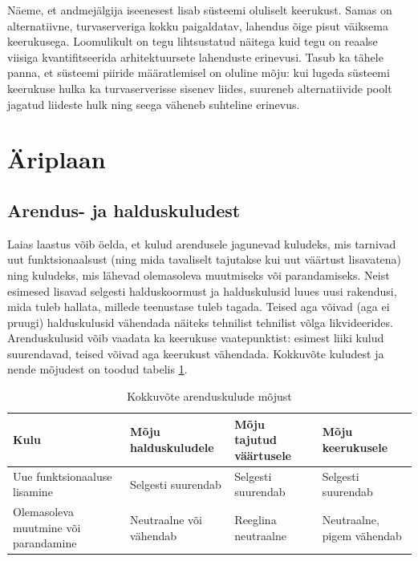 \documentclass{article}
\begin{document}
Näeme, et andmejälgija iseenesest lisab süsteemi oluliselt keerukust. Samas on alternatiivne, turvaserveriga kokku paigaldatav, lahendus õige pisut väiksema keerukusega. Loomulikult on tegu lihtsustatud näitega kuid tegu on reaalse viisiga kvantifitseerida arhitektuursete lahenduste erinevusi. Tasub ka tähele panna, et süsteemi piiride määratlemisel on oluline mõju: kui lugeda süsteemi keerukuse hulka ka turvaserverisse sisenev liides, suureneb alternatiivide poolt jagatud liideste hulk ning seega väheneb suhteline erinevus. 
	
\section{Äriplaan}
\subsection{Arendus- ja halduskuludest}
\label{sec:kulud}
Laias laastus võib öelda, et kulud arendusele jagunevad kuludeks, mis tarnivad uut funktsionaalsust (ning mida tavaliselt tajutakse kui uut väärtust lisavatena) ning kuludeks, mis lähevad olemasoleva muutmiseks või parandamiseks. Neist esimesed lisavad selgesti halduskoormust ja halduskulusid luues uusi rakendusi, mida tuleb hallata, millede teenustase tuleb tagada. Teised aga võivad (aga ei pruugi) halduskulusid vähendada näiteks tehnilist tehnilist võlga likvideerides. Arenduskulusid võib vaadata ka keerukuse vaatepunktist: esimest liiki kulud suurendavad, teised võivad aga keerukust vähendada. Kokkuvõte kuludest ja nende mõjudest on toodud tabelis \ref{tab:arendus}.

\begin{table}
	\begin{center}
		\begin{tabular}{p{3.8cm}p{2.4cm}p{2.1cm}p{2.7cm}}
		\toprule
Kulu & Mõju \mbox{halduskuludele} & Mõju tajutud väärtusele & Mõju \mbox{keerukusele} \\
\midrule

Uue funktsionaaluse \mbox{lisamine} & Selgesti \mbox{suurendab} & Selgesti \mbox{suurendab} & Selgesti \mbox{suurendab} \\
\addlinespace
Olemasoleva muutmine või parandamine & Neutraalne või vähendab & Reeglina \mbox{neutraalne} & Neutraalne, \mbox{pigem} vähendab \\

\bottomrule
		\end{tabular}
		\caption{Kokkuvõte arenduskulude mõjust}
		\label{tab:arendus}
	\end{center}
\end{table}
\end{document}
